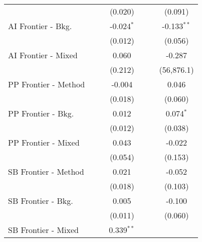 \begin{tabular}{lcccccc}
                        &                &                & (0.020)        &                &                & (0.091)\\   
   AI Frontier - Bkg.   &                &                & -0.024$^{*}$   &                &                & -0.133$^{**}$\\   
                        &                &                & (0.012)        &                &                & (0.056)\\   
   AI Frontier - Mixed  &                &                & 0.060          &                &                & -0.287\\   
                        &                &                & (0.212)        &                &                & (56,876.1)\\   
   PP Frontier - Method &                &                & -0.004         &                &                & 0.046\\   
                        &                &                & (0.018)        &                &                & (0.060)\\   
   PP Frontier - Bkg.   &                &                & 0.012          &                &                & 0.074$^{*}$\\   
                        &                &                & (0.012)        &                &                & (0.038)\\   
   PP Frontier - Mixed  &                &                & 0.043          &                &                & -0.022\\   
                        &                &                & (0.054)        &                &                & (0.153)\\   
   SB Frontier - Method &                &                & 0.021          &                &                & -0.052\\   
                        &                &                & (0.018)        &                &                & (0.103)\\   
   SB Frontier - Bkg.   &                &                & 0.005          &                &                & -0.100\\   
                        &                &                & (0.011)        &                &                & (0.060)\\   
   SB Frontier - Mixed  &                &                & 0.339$^{**}$   &                &                &   \\   

\end{tabular}
